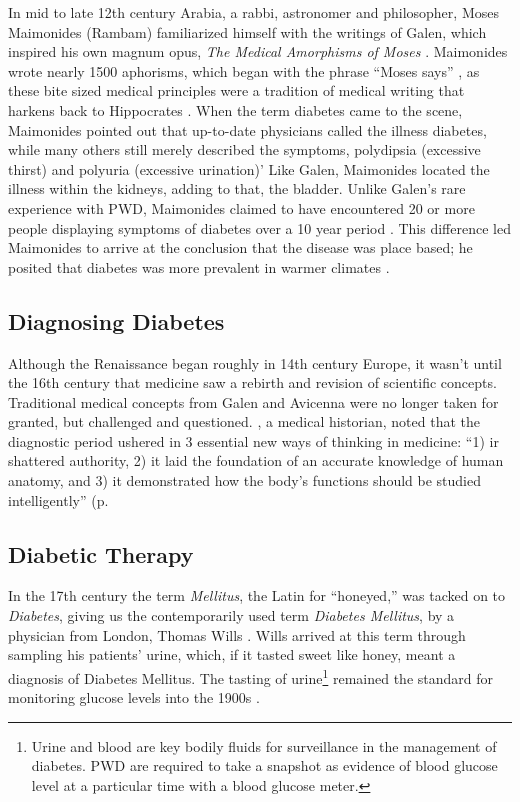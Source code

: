 \documentclass[12pt]{article}
\begin{document}
In mid to late 12th century Arabia, a rabbi, astronomer and philosopher, Moses Maimonides (Rambam) familiarized himself with the writings of Galen, which inspired his own magnum opus, \textit{The Medical Amorphisms of Moses} \citep{maimonides_1989_medical}. Maimonides wrote nearly 1500 aphorisms, which began with the phrase ``Moses says'' \citep{maimonides_1989_medical}, as these bite sized medical principles were a tradition of medical writing that harkens back to Hippocrates \citep{sanders_2001_philatelic}. When the term diabetes came to the scene, Maimonides pointed out that up-to-date physicians called the illness diabetes, while many others still merely described the symptoms, polydipsia (excessive thirst) and polyuria (excessive urination)' Like Galen, Maimonides located the illness within the kidneys, adding to that, the bladder.  Unlike Galen's rare experience with PWD, Maimonides claimed to have encountered 20 or more people displaying symptoms of diabetes over a 10 year period \citep{maimonides_1989_medical}. This difference led Maimonides to arrive at the conclusion that the disease was place based; he posited that diabetes was more prevalent in warmer climates \citep{maimonides_1989_medical}.

\subsection{Diagnosing Diabetes} 

Although the Renaissance began roughly in 14th century Europe, it wasn't until the 16th century that medicine saw a rebirth and revision of scientific concepts. Traditional medical concepts from Galen and Avicenna were no longer taken for granted, but challenged and questioned. \citet{osler_1921_evolution}, a medical historian, noted that the diagnostic period ushered in 3 essential new ways of thinking in medicine: ``1) ir shattered authority, 2) it laid the foundation of an accurate knowledge of human anatomy, and 3) it demonstrated how the body's functions should be studied intelligently'' (p.  

\subsection{Diabetic Therapy}
In the 17th century the term \textit{Mellitus}, the Latin for ``honeyed,'' was tacked on to \textit{Diabetes}, giving us the contemporarily used term \textit{Diabetes Mellitus}, by a physician from London, Thomas Wills \citep{sattley_history_1996}. Wills arrived at this term through sampling his patients' urine, which, if it tasted sweet like honey, meant a diagnosis of Diabetes Mellitus. The tasting of urine\footnote{Urine and blood are key bodily fluids for surveillance in the management of diabetes. PWD are required to take a snapshot as evidence of blood glucose level at a particular time with a blood glucose meter.} remained the standard for monitoring glucose levels into the 1900s \citep{sattley_history_1996}. 
\end{document}
